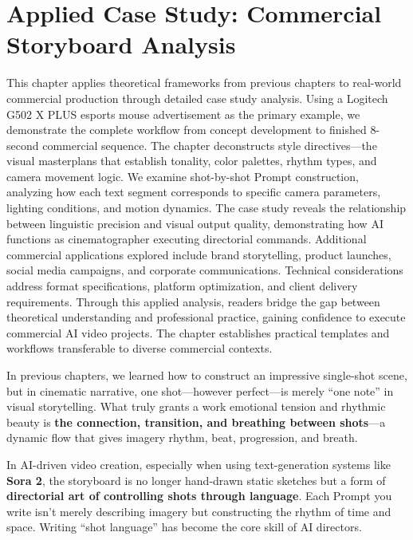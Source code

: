 \chapter{Applied Case Study: Commercial Storyboard Analysis}
\label{ch:concept-to-sequence}

\begin{chapterabstract}
This chapter applies theoretical frameworks from previous chapters to real-world commercial production through detailed case study analysis. Using a Logitech G502 X PLUS esports mouse advertisement as the primary example, we demonstrate the complete workflow from concept development to finished 8-second commercial sequence. The chapter deconstructs style directives—the visual masterplans that establish tonality, color palettes, rhythm types, and camera movement logic. We examine shot-by-shot Prompt construction, analyzing how each text segment corresponds to specific camera parameters, lighting conditions, and motion dynamics. The case study reveals the relationship between linguistic precision and visual output quality, demonstrating how AI functions as cinematographer executing directorial commands. Additional commercial applications explored include brand storytelling, product launches, social media campaigns, and corporate communications. Technical considerations address format specifications, platform optimization, and client delivery requirements. Through this applied analysis, readers bridge the gap between theoretical understanding and professional practice, gaining confidence to execute commercial AI video projects. The chapter establishes practical templates and workflows transferable to diverse commercial contexts.
\end{chapterabstract}

In previous chapters, we learned how to construct an impressive single-shot scene, but in cinematic narrative, one shot—however perfect—is merely ``one note'' in visual storytelling. What truly grants a work emotional tension and rhythmic beauty is \textbf{the connection, transition, and breathing between shots}—a dynamic flow that gives imagery rhythm, beat, progression, and breath.

In AI-driven video creation, especially when using text-generation systems like \textbf{Sora 2}, the storyboard is no longer hand-drawn static sketches but a form of \textbf{directorial art of controlling shots through language}. Each Prompt you write isn't merely describing imagery but constructing the rhythm of time and space. Writing ``shot language'' has become the core skill of AI directors.

